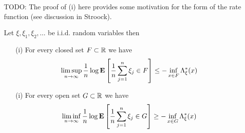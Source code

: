 TODO: The proof of (i) here provides some motivation for the form of the rate function (see discussion in Stroock).
\begin{thm}\label{CramersTheoremOneDimension} Let $\xi, \xi_1, \xi_2, \dotsc$ be i.i.d. random variables then
\begin{itemize}
\item[(i)] For every closed set $F \subset \mathbb{R}$ we have 
\begin{align*}
\limsup_{n \to \infty} \frac{1}{n} \log \textbf{E}\left[\frac{1}{n} \sum_{j=1}^n \xi_j \in F\right] &\leq -\inf_{x \in F} \Lambda_\xi^*(x)
\end{align*}
\item[(i)] For every open set $G \subset \mathbb{R}$ we have 
\begin{align*}
\liminf_{n \to \infty} \frac{1}{n} \log \textbf{E}\left[\frac{1}{n} \sum_{j=1}^n \xi_j \in G\right] &\geq -\inf_{x \in G} \Lambda_\xi^*(x)
\end{align*}
\end{itemize}
\end{thm}
